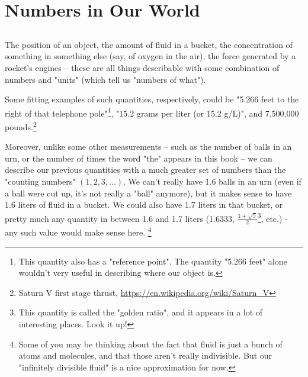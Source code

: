 \documentclass{article}
\begin{document}










\section{Numbers in Our World}

\subsection{}

The position of an object, the amount of fluid in a bucket, the concentration of something in something else (say, of oxygen in the air), the force generated by a rocket's engines -- these are all things describable with some combination of numbers and "units" (which tell us "numbers of what"). 


Some fitting examples of such quantities, respectively, could be "5.266 feet to the right of that telephone pole"\footnote{This quantity also has a "reference point". The quantity "5.266 feet" alone wouldn't very useful in describing where our object is.}, "15.2 grams per liter (or 15.2 g/L)", and 7,500,000 pounds.\footnote{Saturn V first stage thrust, \url{https://en.wikipedia.org/wiki/Saturn_V}}



Moreover, unlike some other measurements -- such as the number of balls in an urn, or the number of times the word "the" appears in this book -- we can describe our previous quantities with a much greater set of numbers than the "counting numbers" $(1, 2, 3, ...)$. We can't really have 1.6 balls in an urn (even if a ball were cut up, it's not really a "ball" anymore), but it makes sense to have 1.6 liters of fluid in a bucket. We could also have 1.7 liters in that bucket, or pretty much any quantity in between 1.6 and 1.7 liters (1.6333, $\frac{1 + \sqrt{5}}{2}$\footnote{This quantity is called the "golden ratio", and it appears in a lot of interesting places. Look it up!}, etc.) - any such value would make sense here. \footnote{Some of you may be thinking about the fact that fluid is just a bunch of atoms and molecules, and that those aren't really indivisible. But our "infinitely divisible fluid" is a nice approximation for now.}
\end{document}
